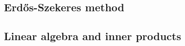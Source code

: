 \begin{definition}
  \label{def:algorithm-state}
\end{definition}



\subsection{Erdős-Szekeres method}



\subsection{Linear algebra and inner products}


